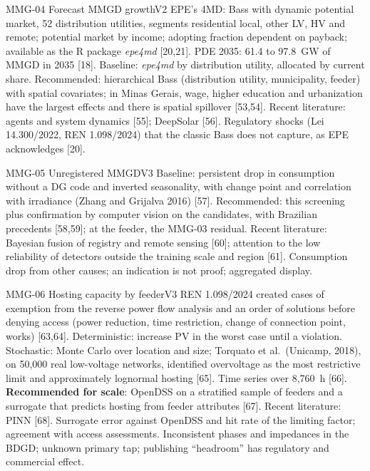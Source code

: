 \begin{ficha}{MMG-04 \textperiodcentered{} Forecast MMGD growth}{V2}
 EPE's 4MD: Bass with dynamic potential
market, 52 distribution utilities, segments residential local, other LV, HV and
remote; potential market by income; adopting fraction dependent on payback;
available as the R package \emph{epe4md} [20,21]. PDE 2035: 61.4 to 97.8~GW of
MMGD in 2035 [18].
 Baseline: \emph{epe4md} by distribution utility, allocated
by current share. Recommended: hierarchical Bass (distribution utility,
municipality, feeder) with spatial covariates; in Minas Gerais, wage,
higher education and urbanization have the largest effects and there is spatial spillover [53,54].
Recent literature: agents and system dynamics [55]; DeepSolar [56].
 Regulatory shocks (Lei 14.300/2022, REN 1.098/2024) that
the classic Bass does not capture, as EPE acknowledges [20].
\end{ficha}

\begin{ficha}{MMG-05 \textperiodcentered{} Unregistered MMGD}{V3}
 Baseline: persistent drop in consumption without a DG
code and inverted seasonality, with change point and correlation with
irradiance (Zhang and Grijalva 2016) [57]. Recommended: this screening plus
confirmation by computer vision on the candidates, with Brazilian
precedents [58,59]; at the feeder, the MMG-03 residual. Recent literature: Bayesian
fusion of registry and remote sensing [60]; attention to the low
reliability of detectors outside the training scale and region [61].
 Consumption drop from other causes; an indication is not proof;
aggregated display.
\end{ficha}

\begin{ficha}{MMG-06 \textperiodcentered{} Hosting capacity by feeder}{V3}
 REN 1.098/2024 created cases of exemption from the reverse
power flow analysis and an order of solutions before denying access (power
reduction, time restriction, change of connection point, works) [63,64].
 Deterministic: increase PV in the worst case until a violation.
Stochastic: Monte Carlo over location and size; Torquato et al.\ (Unicamp,
2018), on 50,000 real low-voltage networks, identified overvoltage as
the most restrictive limit and approximately lognormal hosting [65]. Time
series over 8,760~h [66]. \textbf{Recommended for scale}: OpenDSS on a
stratified sample of feeders and a surrogate that predicts hosting from
feeder attributes [67]. Recent literature: PINN [68].
 Surrogate error against OpenDSS and hit rate of the limiting
factor; agreement with access assessments.
 Inconsistent phases and impedances in the BDGD; unknown
primary tap; publishing ``headroom'' has regulatory and commercial effect.
\end{ficha}

